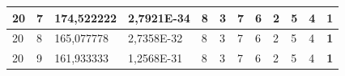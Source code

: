 \documentclass[conference]{IEEEtran}
\begin{document}
\begin{table}[]
\begin{tabular}{|llll|llllllll|}
\multicolumn{1}{|l|}{20}                                                    & \multicolumn{1}{l|}{7}                                                        & \multicolumn{1}{l|}{174,522222}                                                   & 2,7921E-34                     & \multicolumn{1}{l|}{8}                                                  & \multicolumn{1}{l|}{3}                                                  & \multicolumn{1}{l|}{7}                                                  & \multicolumn{1}{l|}{6}                                                  & \multicolumn{1}{l|}{2}                                                  & \multicolumn{1}{l|}{5}                                                  & \multicolumn{1}{l|}{4}                                                  & \textbf{1}                 \\ \hline
\multicolumn{1}{|l|}{20}                                                    & \multicolumn{1}{l|}{8}                                                        & \multicolumn{1}{l|}{165,077778}                                                   & 2,7358E-32                     & \multicolumn{1}{l|}{8}                                                  & \multicolumn{1}{l|}{3}                                                  & \multicolumn{1}{l|}{7}                                                  & \multicolumn{1}{l|}{6}                                                  & \multicolumn{1}{l|}{2}                                                  & \multicolumn{1}{l|}{5}                                                  & \multicolumn{1}{l|}{4}                                                  & \textbf{1}                 \\ \hline
\multicolumn{1}{|l|}{20}                                                    & \multicolumn{1}{l|}{9}                                                        & \multicolumn{1}{l|}{161,933333}                                                   & 1,2568E-31                     & \multicolumn{1}{l|}{8}                                                  & \multicolumn{1}{l|}{3}                                                  & \multicolumn{1}{l|}{7}                                                  & \multicolumn{1}{l|}{6}                                                  & \multicolumn{1}{l|}{2}                                                  & \multicolumn{1}{l|}{5}                                                  & \multicolumn{1}{l|}{4}                                                  & \textbf{1}                 \\ \hline
\end{tabular}
\label{tab:tabla1.2}
\end{table}
\end{document}
